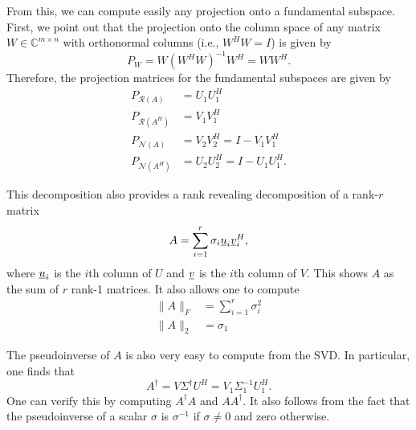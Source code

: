 From this, we can compute easily any projection onto a fundamental subspace.
First, we point out that the projection onto the column space of any matrix $W\in \mathbb{C}^{m \times n}$ with orthonormal columns (i.e., $W^H W = I$) is given by
\[ P_W = W (W^H W)^{-1} W^H = W W^H. \]
Therefore, the projection matrices for the fundamental subspaces are given by
\begin{align*}
P_{\mathcal{R}(A)} &= U_1 U_1^H \\
P_{\mathcal{R}(A^H)} &= V_1 V_1^H \\
P_{\mathcal{N}(A)} &= V_2 V_2^H = I - V_1 V_1^H \\
P_{\mathcal{N}(A^H)} &= U_2 U_2^H = I - U_1 U_1^H.
\end{align*}

This decomposition also provides a rank revealing decomposition of a rank-$r$ matrix
\[ A = \sum_{i=1}^r \sigma_i \underline{u}_i \underline{v}_i^H, \]
where $\underline{u}_i$ is the $i$th column of $U$ and $\underline{v}$ is the $i$th column of $V$.
This shows $A$ as the sum of $r$ rank-1 matrices.
It also allows one to compute
\begin{align*}
\| A \|_F &= \sum_{i=1}^r \sigma_i^2 \\
\| A \|_2 &= \sigma_1
\end{align*}

The pseudoinverse of $A$ is also very easy to compute from the SVD.
In particular, one finds that
\[ A^\dagger = V \Sigma^\dagger U^H = V_1 \Sigma_1^{-1} U_1^H. \]
One can verify this by computing $A^\dagger A$ and $A A^\dagger$.
It also follows from the fact that the pseudoinverse of a scalar $\sigma$ is $\sigma^{-1}$ if $\sigma \neq 0$ and zero otherwise.



